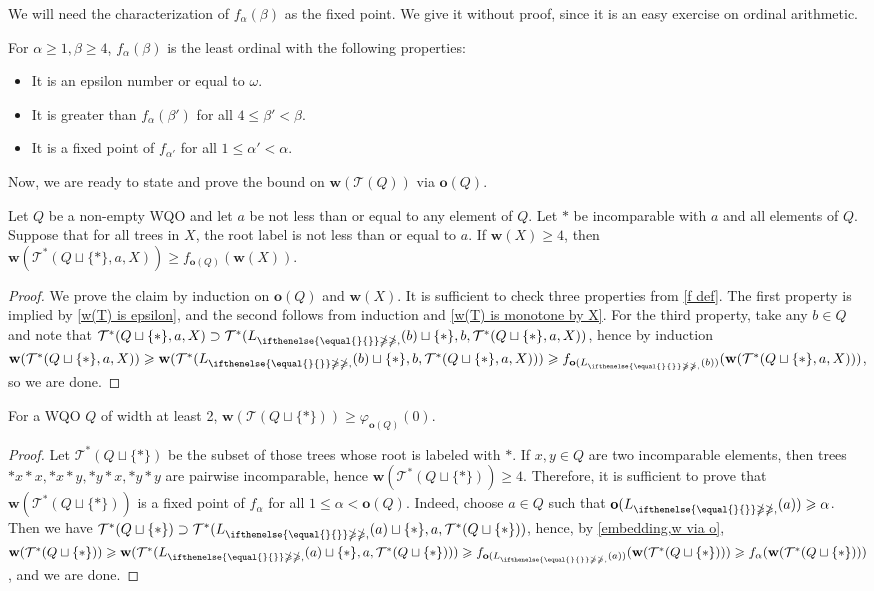 \documentclass[runningheads]{llncs}
\let \leq \leqslant
\let \geq \geqslant
\let \ngeq \ngeqslant
\let \phi \varphi
\renewcommand \L [2][]{L_{\ifthenelse{\equal{#1}{}}\ngeq{\ngeq,#1}}(#2)}
\renewcommand \l [2][]{\o(\L[#1]{#2})}
\def \T {\mathcal{T}}
\def \o {\textbf{o}}
\def \w {\textbf{w}}
\begin{document}
We will need the characterization of $f_\alpha(\beta)$ as the fixed point. We give it without proof, since it is an easy exercise on ordinal arithmetic.

\begin{lemma}\label{f def}
    For $\alpha \geq 1, \beta \geq 4$, $f_\alpha(\beta)$ is the least ordinal with the following properties:
    \begin{itemize}
        \item It is an epsilon number or equal to $\omega$.
        \item It is greater than $f_\alpha(\beta')$ for all $4 \leq \beta' < \beta$.
        \item It is a fixed point of $f_{\alpha'}$ for all $1 \leq \alpha' < \alpha$.
    \end{itemize}
\end{lemma}

Now, we are ready to state and prove the bound on $\w(\T(Q))$ via $\o(Q)$.

\begin{lemma}\label{w via o}
    Let $Q$ be a non-empty WQO and let $a$ be not less than or equal to any element of $Q$.
    Let $*$ be incomparable with $a$ and all elements of $Q$.
    Suppose that for all trees in $X$, the root label is not less than or equal to $a$.
    If $\w(X) \geq 4$, then $\w(\T^*(Q\sqcup\{*\}, a, X)) \geq f_{\o(Q)}(\w(X))$.
\end{lemma}
\begin{proof}
    We prove the claim by induction on $\o(Q)$ and $\w(X)$. It is sufficient to check three properties from \cref{f def}.
    The first property is implied by \cref{w(T) is epsilon}, and the second follows from induction and \cref{w(T) is monotone by X}. For the third property, take any $b \in Q$ and note that $\T^*(Q\sqcup\{*\}, a, X) \supset \T^*(\L{b}\sqcup\{*\}, b, \T^*(Q\sqcup\{*\}, a, X))$, hence by induction $\w(\T^*(Q\sqcup\{*\}, a, X)) \geq \w(\T^*(\L{b}\sqcup\{*\}, b, \T^*(Q\sqcup\{*\}, a, X))) \geq f_{\l{b}}(\w(\T^*(Q\sqcup\{*\}, a, X)))$, so we are done.
\end{proof}

\begin{proposition}\label{w T(Q cup *)}
    For a WQO $Q$ of width at least 2, $\w(\T(Q \sqcup \{*\})) \geq \phi_{\o(Q)}(0)$.
\end{proposition}
\begin{proof}
    Let $\T^*(Q\sqcup\{*\})$ be the subset of those trees whose root is labeled with $*$. If $x,y \in Q$ are two incomparable elements, then trees $*x*x,*x*y,*y*x,*y*y$ are pairwise incomparable, hence $\w(\T^*(Q\sqcup\{*\})) \geq 4$. Therefore, it is sufficient to prove that $\w(\T^*(Q\sqcup\{*\}))$ is a fixed point of $f_\alpha$ for all $1 \leq \alpha < \o(Q)$.
    Indeed, choose $a \in Q$ such that $\l{a} \geq \alpha$. Then we have $\T^*(Q\sqcup\{*\}) \supset \T^*(\L{a}\sqcup\{*\}, a, \T^*(Q\sqcup\{*\}))$, hence, by \cref{embedding,w via o}, $\w(\T^*(Q\sqcup\{*\})) \geq \w(\T^*(\L{a}\sqcup\{*\}, a, \T^*(Q\sqcup\{*\}))) \geq f_{\l{a}}(\w(\T^*(Q\sqcup\{*\}))) \geq f_\alpha(\w(\T^*(Q\sqcup\{*\})))$, and we are done.
\end{proof}
\end{document}
